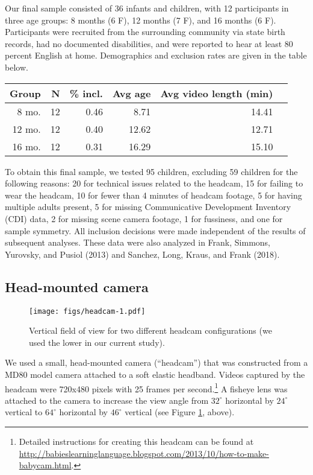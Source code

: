 \documentclass[english,man]{apa6}
\begin{document}
Our final sample consisted of 36 infants and children, with 12
participants in three age groups: 8 months (6 F), 12 months (7 F), and
16 months (6 F). Participants were recruited from the surrounding
community via state birth records, had no documented disabilities, and
were reported to hear at least 80 percent English at home. Demographics
and exclusion rates are given in the table below.

\begin{table}[ht]
\centering
\begin{tabular}{rrrrrr}
\hline
Group & N & \% incl. & Avg age & Avg video length (min) \\
\hline
8 mo. &   12 & 0.46 & 8.71 & 14.41 \\
12 mo. &  12 & 0.40 & 12.62 & 12.71 \\
16 mo. &  12 & 0.31 & 16.29 & 15.10\\
\hline
\end{tabular}
\end{table}

To obtain this final sample, we tested 95 children, excluding 59
children for the following reasons: 20 for technical issues related to
the headcam, 15 for failing to wear the headcam, 10 for fewer than 4
minutes of headcam footage, 5 for having multiple adults present, 5 for
missing Communicative Development Inventory (CDI) data, 2 for missing
scene camera footage, 1 for fussiness, and one for sample symmetry. All
inclusion decisions were made independent of the results of subsequent
analyses. These data were also analyzed in Frank, Simmons, Yurovsky, and
Pusiol (2013) and Sanchez, Long, Kraus, and Frank (2018).

\subsection{Head-mounted camera}\label{head-mounted-camera}

\begin{figure}[htbp]
\centering
\texttt{[image: figs/headcam-1.pdf]}
\caption{\label{fig:headcam}Vertical field of view for two different headcam
configurations (we used the lower in our current study).}
\end{figure}

We used a small, head-mounted camera (\enquote{headcam}) that was
constructed from a MD80 model camera attached to a soft elastic
headband. Videos captured by the headcam were 720x480 pixels with 25
frames per second.\footnote{Detailed instructions for creating this
  headcam can be found at
  \url{http://babieslearninglanguage.blogspot.com/2013/10/how-to-make-babycam.html}.}
A fisheye lens was attached to the camera to increase the view angle
from \(32^{\circ}\) horizontal by \(24^{\circ}\) vertical to
\(64^{\circ}\) horizontal by \(46^{\circ}\) vertical (see Figure
\ref{fig:headcam}, above).
\end{document}
